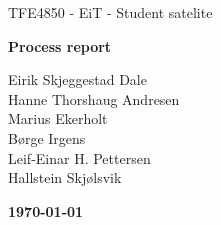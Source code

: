 \begin{titlepage}
\begin{center}

\vspace*{6cm}
{\Huge TFE4850 - EiT - Student satelite}

\vspace*{0.5cm}
{\LARGE\textbf{Process report}}

\vspace*{0.7cm}
{\Large
	Eirik Skjeggestad Dale\\
	Hanne Thorshaug Andresen\\
	Marius Ekerholt\\
	Børge Irgens\\
	Leif-Einar H. Pettersen\\
	Hallstein Skjølsvik
}

{\vfill\textbf{\today}}

\end{center}
\end{titlepage}